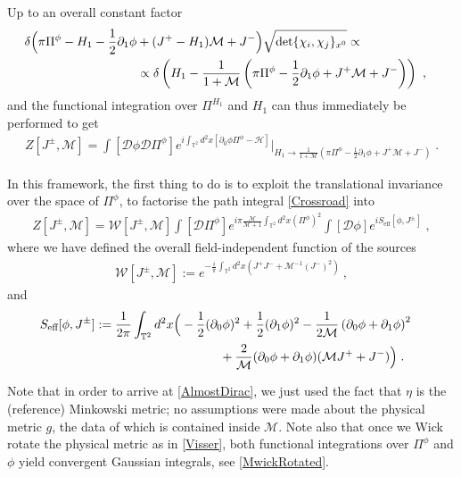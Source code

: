 \documentclass[11pt]{article}
\numberwithin{equation}{section}
\begin{document}
Up to an overall constant factor
\begin{align}
\delta\Big(\pi\Pi^\phi-H_1-\frac12\partial_1 \phi &+(J^+-H_1)\mathcal{M}+J^-\Big)
\sqrt{\det\{\chi_i,\chi_j\}_{x^0}}\propto\cr
&\propto\delta\left(H_1-\frac{1}{1+\mathcal M}\left(\pi\Pi^\phi-\frac12\partial_1 \phi+J^+\mathcal M+J^-\right)\right)\ ,
\end{align}
and the functional integration over $\Pi^{H_1}$ and $H_1$ can thus immediately be performed to get
\begin{align}
\label{Crossroad}
Z[J^\pm,\mathcal M ]=\int[\mathcal D\phi\mathcal D\Pi^\phi] e^{i\int_{\mathbb T^2}d^2 x\left[\partial_0\phi \Pi^\phi-\mathcal H\right]}\Bigg|_{H_1\to\frac{1}{1+\mathcal M}\left(\pi\Pi^\phi-\frac12\partial_1 \phi+J^+\mathcal M+J^-\right)}\;.
\end{align}

In this framework, the first thing to do is to exploit the translational invariance over the space of $\Pi^\phi$, to factorise the path integral \eqref{Crossroad} into
\begin{align}
Z[J^\pm,\mathcal M]= \mathcal{W}[J^\pm, {\mathcal M}] \int [\mathcal D\Pi^\phi] e^{i\pi\frac{\mathcal M}{\mathcal M+1}\int_{\mathbb T^2}d^2 x(\Pi^\phi)^2}  \int[\mathcal D\phi]e^{i S_{\text{eff}}[\phi,J^\pm]}\;,
\label{AlmostDirac}
\end{align}
where we have defined the overall field-independent function of the sources
\begin{align}\label{anomalous}
 \mathcal{W}[J^\pm,{\mathcal M}]    :=e^{-\frac{i}{\pi} \int_{\mathbb T^2} d^2x (J^+J^-+{\mathcal M}^{-1}(J^-)^2)} \ ,
\end{align}
and
\begin{align}
  S_{\text{eff}}[\phi,J^\pm]
&:=\frac{1}{2\pi}\int_{\mathbb T^2}d^2 x \Big(-\frac12(\partial_0\phi)^2+\frac12(\partial_1\phi)^2-\frac{1}{2\mathcal M}\left(\partial_0\phi+\partial_1\phi\right)^2\cr 
&\qquad\qquad\qquad\qquad\qquad+\frac{2}{\mathcal M}(\partial_0\phi+\partial_1\phi)(\mathcal M J^++J^-)\Big)
\label{Sen'sEffective}\;.
\end{align}

Note that in order to arrive at \eqref{AlmostDirac}, we just used the fact that $\eta$ is the (reference) Minkowski metric; no assumptions were made about the physical metric $g$, the data of which is contained inside $\mathcal M$. 
Note also that once we Wick rotate the physical metric as in \eqref{Visser}, both functional integrations over $\Pi^\phi$ and $\phi$ yield convergent Gaussian integrals, see \eqref{MwickRotated}. 
\end{document}
